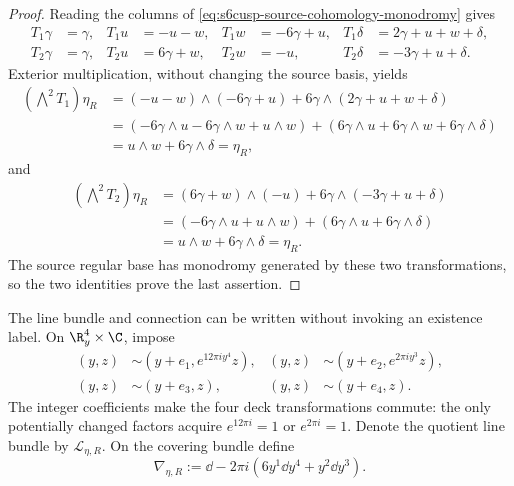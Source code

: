 \begin{proof}
Reading the columns of \eqref{eq:s6cusp-source-cohomology-monodromy} gives
\begin{align*}
 T_1\gamma&=\gamma,&
 T_1u&=-u-w,&
 T_1w&=-6\gamma+u,&
 T_1\delta&=2\gamma+u+w+\delta,\\
 T_2\gamma&=\gamma,&
 T_2u&=6\gamma+w,&
 T_2w&=-u,&
 T_2\delta&=-3\gamma+u+\delta.
\end{align*}
Exterior multiplication, without changing the source basis, yields
\begin{align*}
 (\bigwedge^2T_1)\eta_R
 &=(-u-w)\wedge(-6\gamma+u)
   +6\gamma\wedge(2\gamma+u+w+\delta)\\
 &=(-6\gamma\wedge u-6\gamma\wedge w+u\wedge w)
   +(6\gamma\wedge u+6\gamma\wedge w
     +6\gamma\wedge\delta)\\
 &=u\wedge w+6\gamma\wedge\delta=\eta_R,
\end{align*}
and
\begin{align*}
 (\bigwedge^2T_2)\eta_R
 &=(6\gamma+w)\wedge(-u)
   +6\gamma\wedge(-3\gamma+u+\delta)\\
 &=(-6\gamma\wedge u+u\wedge w)
   +(6\gamma\wedge u+6\gamma\wedge\delta)\\
 &=u\wedge w+6\gamma\wedge\delta=\eta_R.
\end{align*}
The source regular base has monodromy generated by these two transformations,
so the two identities prove the last assertion.
\end{proof}

The line bundle and connection can be written without invoking an existence
label.  On \(\R^4_y\times\C\), impose
\begin{align}
 (y,z)&\sim(y+e_1,e^{12\pi i y^4}z),
 & (y,z)&\sim(y+e_2,e^{2\pi i y^3}z),
 \label{eq:s6cusp-native-line-clutch-one}\\
 (y,z)&\sim(y+e_3,z),
 & (y,z)&\sim(y+e_4,z).
 \label{eq:s6cusp-native-line-clutch-two}
\end{align}
The integer coefficients make the four deck transformations commute: the
only potentially changed factors acquire \(e^{12\pi i}=1\) or
\(e^{2\pi i}=1\).  Denote the quotient line bundle by
\(\mathcal L_{\eta,R}\).  On the covering bundle define
\begin{equation}\label{eq:s6cusp-native-line-connection}
 \nabla_{\eta,R}:=
 \dd-2\pi i\left(6y^1\dd y^4+y^2\dd y^3\right).
\end{equation}

